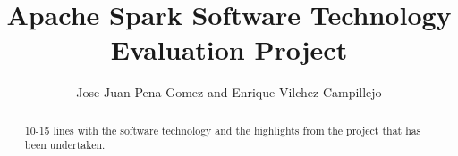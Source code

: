 \documentclass[11pt]{article}
\begin{document}
\title{Apache Spark Software Technology Evaluation Project}

\author{Jose Juan Pena Gomez and Enrique Vilchez Campillejo}

\maketitle

\begin{abstract}

  10-15 lines with the software technology and the highlights from the
  project that has been undertaken.
  
\end{abstract}

%












{}
\end{document}
